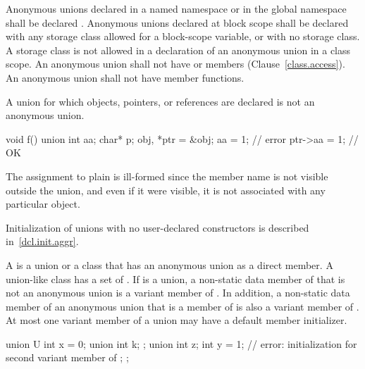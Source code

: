 \pnum
{}%
%
Anonymous unions declared in a named namespace or in the global
namespace shall be declared . Anonymous unions declared at
block scope shall be declared with any storage class allowed for a
block-scope variable, or with no storage class. A storage class is not
allowed in a declaration of an anonymous union in a class scope.
%
%
An anonymous union shall not have  or 
members (Clause~\ref{class.access}). An anonymous union shall not have
member functions.

\pnum
A union for which objects, pointers, or references are declared is not an anonymous union.
\begin{example}

\begin{codeblock}
void f() {
  union { int aa; char* p; } obj, *ptr = &obj;
  aa = 1;           // error
  ptr->aa = 1;      // OK
}
\end{codeblock}

The assignment to plain  is ill-formed since the member name
is not visible outside the union, and even if it were visible, it is not
associated with any particular object.
\end{example}
\begin{note}
Initialization of unions with no user-declared constructors is described
in~\ref{dcl.init.aggr}.
\end{note}

\pnum
{}%
%
A  is a union or a class that has an anonymous union as a direct
member. A union-like class  has a set of .
If  is a union, a non-static data member of  that is not an anonymous
union is a variant member of . In addition, a non-static data member of an
anonymous union that is a member of  is also a variant member of .
At most one variant member of a union may have a default member initializer.
\begin{example}
\begin{codeblock}
union U {
  int x = 0;
  union {
    int k;
  };
  union {
    int z;
    int y = 1;      // error: initialization for second variant member of 
  };
};
\end{codeblock}
\end{example}

